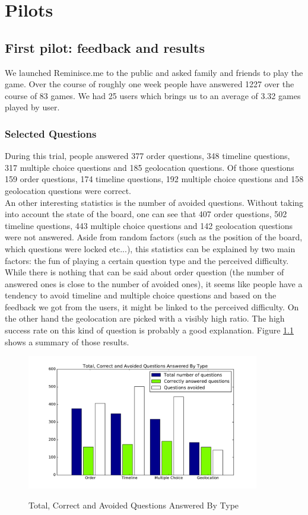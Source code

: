 \chapter{Pilots}
\section{First pilot: feedback and results}
We launched Reminisce.me to the public and asked family and friends to play the game. Over the course of roughly one week people have answered 1227 over the course of 83 games. We had 25 users which brings us to an average of 3.32 games played by user.
\subsection{Selected Questions}
During this trial, people answered 377 order questions, 348 timeline questions, 317 multiple choice questions and 185 geolocation questions. Of those questions 159 order questions, 174 timeline questions, 192 multiple choice questions and 158 geolocation questions were correct.\\
An other interesting statistics is the number of avoided questions. Without taking into account the state of the board, one can see that 407 order questions, 502 timeline questions, 443 multiple choice questions and 142 geolocation questions were not answered. Aside from random factors (such as the position of the board, which questions were locked etc...), this statistics can be explained by two main factors: the fun of playing a certain question type and the perceived difficulty. While there is nothing that can be said about order question (the number of answered ones is close to the number of avoided ones), it seems like people have a tendency to avoid timeline and multiple choice questions and based on the feedback we got from the users, it might be linked to the perceived difficulty. On the other hand the geolocation are picked with a visibly high ratio. The high success rate on this kind of question is probably a good explanation. Figure \ref{fig:p1TotCorrectAvoid} shows a summary of those results.
\begin{figure}
\centering
{\includegraphics[width=4in]{images/pilot_1_selected_questions.pdf}}
\caption{Total, Correct and Avoided Questions Answered By Type}
\label{fig:p1TotCorrectAvoid}
\end{figure}
